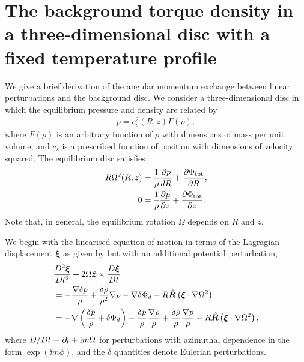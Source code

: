 \section{The background torque density in a three-dimensional disc with
  a fixed temperature profile}\label{tbg_deriv}
We give a brief derivation of the angular momentum exchange between
linear perturbations and the background disc. We consider a
three-dimensional disc in which the equilibrium pressure and density
are related by 
\begin{align}\label{iso_cond}
  p = c_s^2(R,z)F(\rho),
\end{align} 
where $F(\rho)$ is an arbitrary function of $\rho$ with dimensions of
mass per unit volume, and $c_s$ is a prescribed function of
position with dimensions of velocity squared. The equilibrium disc
satisfies 
\begin{align}
  R\Omega^2(R,z) &= \frac{1}{\rho}\frac{\partial p}{d R} +
  \frac{\partial\Phi_\mathrm{tot}}{\partial R}, \\
  0 &= \frac{1}{\rho}\frac{\partial p}{\partial z} + \frac{\partial\Phi_\mathrm{tot}}{\partial
    z}. 
\end{align}
Note that, in general, the equilibrium rotation $\Omega$ depends on
$R$ and $z$. 

We begin with the linearised equation of motion in terms of the
Lagragian displacement $\bm{\xi}$ as given by \cite{lin93b} but with an
additional potential perturbation, 
\begin{align}\label{lagragian_pert}
  &\frac{D^2\bm{\xi}}{Dt^2} +
  2\Omega\hat{\bm{z}}\times\frac{D\bm{\xi}}{Dt}  \notag \\ &= -
  \frac{\nabla \delta p }{\rho} + \frac{\delta\rho}{\rho^2}\nabla\rho  
  -\nabla\delta\Phi_d - R
  \hat{\bm{R}}\left(\bm{\xi}\cdot\nabla\Omega^2\right) \notag \\
  & = -\nabla\left(\frac{\delta p}{\rho} + \delta \Phi_d\right) -
  \frac{\delta p}{\rho}\frac{\nabla\rho}{\rho} +
  \frac{\delta\rho}{\rho}\frac{\nabla p}{\rho} -  R
  \hat{\bm{R}}\left(\bm{\xi}\cdot\nabla\Omega^2\right),
\end{align}
where $D/Dt \equiv \partial_t + \mathrm{i} m \Omega$ for perturbations with
azimuthal dependence in the form $\exp\left(\ii m \phi\right)$, and  
the $\delta$ quantities denote Eulerian perturbations. 

